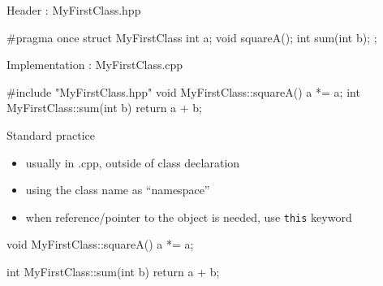 \begin{frame}[fragile]
  \begin{block}{Header : MyFirstClass.hpp}
    \begin{cppcode*}{}
      #pragma once
      struct MyFirstClass {
        int a;
        void squareA();
        int sum(int b);
      };
    \end{cppcode*}
  \end{block}
  \begin{block}{Implementation : MyFirstClass.cpp}
    \begin{cppcode*}{}
      #include "MyFirstClass.hpp"
      void MyFirstClass::squareA() {
        a *= a;
      }
      int MyFirstClass::sum(int b) {
        return a + b;
      }
    \end{cppcode*}
  \end{block}
\end{frame}

\begin{frame}[fragile]
  \begin{block}{Standard practice}
    \begin{itemize}
    \item usually in .cpp, outside of class declaration
    \item using the class name as ``namespace''
    \item when reference/pointer to the object is needed, use \texttt{this} keyword
    \end{itemize}
  \end{block}
  \begin{cppcode}
    void MyFirstClass::squareA() {
      a *= a;
    }

    int MyFirstClass::sum(int b) {
      return a + b;
    }
  \end{cppcode}
\end{frame}

